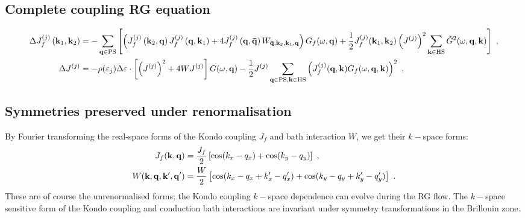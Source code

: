 \documentclass[%
reprint,
superscriptaddress,
groupedaddress,
superscriptaddress,
onecolumn,
10pt
]{revtex4-2}
\begin{document}
\subsection{Complete coupling RG equation}
\begin{equation}\begin{aligned}\label{rgEquation}
	\Delta J_f^{(j)}\left({\bf k}_1, {\bf k}_2\right) &= -\sum_{{\bf q} \in \text{PS}} \left[\left(J_f^{(j)}\left({\bf k}_2,{\bf q}\right) J_f^{(j)}\left({\bf q},{\bf k}_1\right) + 4J_f^{(j)}\left({\bf q}, {\bf \bar q}\right) W_{{\bf \bar q}, {\bf k}_2, {\bf k}_1, {\bf q}}\right) G_f(\omega, {\bf q}) + \frac{1}{2}J_f^{(j)}({\bf k}_1,{\bf k}_2) \left(J^{(j)}\right)^2 \sum_{{\bf k} \in \text{HS}}\tilde G^2(\omega, {\bf q}, {\bf k})\right]~,\\
	\Delta J^{(j)} &= - \rho(\varepsilon_j)\Delta \varepsilon\cdot\left[\left(J^{(j)}\right)^2 + 4WJ^{(j)}\right] G(\omega, {\bf q}) -\frac{1}{2}J^{(j)} \sum_{{\bf q} \in \text{PS} ,{\bf k} \in \text{HS}}\left(J_f^{(j)}({\bf q},{\bf k})G_f(\omega, {\bf q}, {\bf k})\right)^2~,
\end{aligned}\end{equation}

\subsection{Symmetries preserved under renormalisation}
By Fourier transforming the real-space forms of the Kondo coupling \(J_f\) and bath interaction \(W\), we get their \(k-\)space forms:
\begin{equation}\begin{aligned}\label{momentumForm}
	J_f({\bf k}, {\bf q}) &= \frac{J_f}{2}\left[\cos(k_x - q_x) + \cos(k_y - q_y)\right]~,\\
	W({\bf k}, {\bf q}, {\bf k}^\prime, {\bf q}^\prime) &= \frac{W}{2}\left[\cos(k_x - q_x + k^\prime_x - q^\prime_x) + \cos(k_y - q_y + k^\prime_y - q^\prime_y)\right]~.
\end{aligned}\end{equation}
These are of course the unrenormalised forms; the Kondo coupling \(k-\)space dependence can evolve during the RG flow. The \(k-\)space sensitive form of the Kondo coupling and conduction bath interactions are invariant under symmetry transformations in the Brillouin zone.\\
\end{document}
